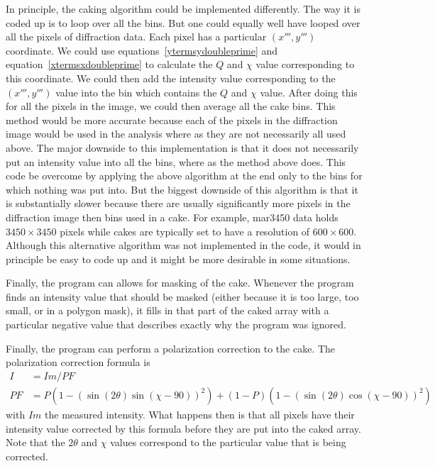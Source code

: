 In principle, the caking algorithm could be implemented
differently. The way it is coded up is to loop over
all the bins. But one could equally well have looped over
all the pixels of diffraction data. Each pixel has a
particular $(x''',y''')$ coordinate. We could use
equations~\ref{ytermsydoubleprime} and
equation~\ref{xtermsxdoubleprime} to calculate the $Q$
and $\chi$ value corresponding to this coordinate. We
could then add the intensity value corresponding to the
$(x''',y''')$ value into the bin which contains the
$Q$ and $\chi$ value. After doing this for all the pixels
in the image, we could then average all the cake bins.
This method would be more accurate because each of the 
pixels in the diffraction image would be used in the analysis
where as they are not necessarily all used above. The major
downside to this implementation is that it does not 
necessarily put an intensity value into all the bins, where 
as the method above does. This code be overcome by applying
the above algorithm at the end only to the bins for which
nothing was put into. But the biggest downside of this 
algorithm is that it is substantially slower because there
are usually significantly more pixels in the diffraction
image then bins used in a cake. For example, mar3450 data
holds $3450\times 3450$ pixels while cakes are typically set
to have a resolution of $600\times 600$. Although
this alternative algorithm was not implemented in the code,
it would in principle be easy to code up and it might
be more desirable in some situations.

Finally, the program can allows for masking of the cake.
Whenever the program finds an intensity value
that should be masked (either because it is too 
large, too small, or in a polygon mask), it fills
in that part of the caked array with a particular 
negative value that describes exactly why the
program was ignored.

Finally, the program can perform a polarization 
correction to the cake. The polarization 
correction formula is
\begin{align}
    I&=Im/PF \\ 
    PF&=P(1 - (\sin(2\theta)\sin(\chi-90))^2) + 
    (1 - P)(1 - (\sin(2\theta)\cos(\chi-90))^2)
\end{align}
with $Im$ the measured intensity. What happens
then is that all pixels have their intensity
value corrected by this formula before they
are put into the caked array. Note that the 
$2\theta$ and $\chi$
values correspond to the particular value
that is being corrected.

